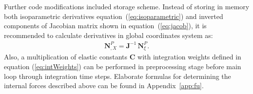 Further code modifications included storage scheme. Instead of storing in memory both isoparametric derivatives equation~(\ref{eq:isoparametric}) and inverted components of Jacobian matrix shown in equation~(\ref{eq:jacob}), it is recommended to calculate derivatives in global coordinates system as:
\begin{eqnarray}
	\textbf{N}^P_{,X} = \textbf{J}^{-1}\,\textbf{N}^P_{\xi}.
\end{eqnarray}
Also, a multiplication of elastic constants \(\textbf{C}\) with integration weights defined in equation (\ref{eq:intWeights}) can be performed in preprocessing stage before main loop through integration time steps.
Elaborate formulas for determining the internal forces described above can be found in Appendix~\ref{app:fu}.

